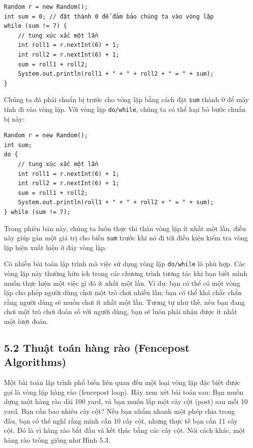 \begin{verbatim}
Random r = new Random();
int sum = 0; // đặt thành 0 để đảm bảo chúng ta vào vòng lặp
while (sum != 7) {
    // tung xúc xắc một lần
    int roll1 = r.nextInt(6) + 1;
    int roll2 = r.nextInt(6) + 1;
    sum = roll1 + roll2;
    System.out.println(roll1 + " + " + roll2 + " = " + sum);
}
\end{verbatim}

Chúng ta đã phải chuẩn bị trước cho vòng lặp bằng cách đặt \texttt{sum} thành 0 để máy tính đi vào vòng lặp. Với vòng lặp \texttt{do/while}, chúng ta có thể loại bỏ bước chuẩn bị này:

\begin{verbatim}
Random r = new Random();
int sum;
do {
    // tung xúc xắc một lần
    int roll1 = r.nextInt(6) + 1;
    int roll2 = r.nextInt(6) + 1;
    sum = roll1 + roll2;
    System.out.println(roll1 + " + " + roll2 + " = " + sum);
} while (sum != 7);
\end{verbatim}

Trong phiên bản này, chúng ta luôn thực thi thân vòng lặp ít nhất một lần, điều này giúp gán một giá trị cho biến \texttt{sum} trước khi nó đi tới điều kiện kiểm tra vòng lặp hiện xuất hiện ở đáy vòng lặp.

Có nhiều bài toán lập trình mà việc sử dụng vòng lặp \texttt{do/while} là phù hợp. Các vòng lặp này thường hữu ích trong các chương trình tương tác khi bạn biết mình muốn thực hiện một việc gì đó ít nhất một lần. Ví dụ: bạn có thể có một vòng lặp cho phép người dùng chơi một trò chơi nhiều lần; bạn có thể khá chắc chắn rằng người dùng sẽ muốn chơi ít nhất một lần. Tương tự như thế, nếu bạn đang chơi một trò chơi đoán số với người dùng, bạn sẽ luôn phải nhận được ít nhất một lượt đoán.

\subsection*{5.2 Thuật toán hàng rào (Fencepost Algorithms)}

Một bài toán lập trình phổ biến liên quan đến một loại vòng lặp đặc biệt được gọi là vòng lặp hàng rào (fencepost loop). Hãy xem xét bài toán sau: Bạn muốn dựng một hàng rào dài 100 yard, và bạn muốn lắp một cây cột (post) sau mỗi 10 yard. Bạn cần bao nhiêu cây cột? Nếu bạn nhẩm nhanh một phép chia trong đầu, bạn có thể nghĩ rằng mình cần 10 cây cột, nhưng thực tế bạn cần 11 cây cột. Đó là vì hàng rào bắt đầu và kết thúc bằng các cây cột. Nói cách khác, một hàng rào trông giống như Hình 5.3.

